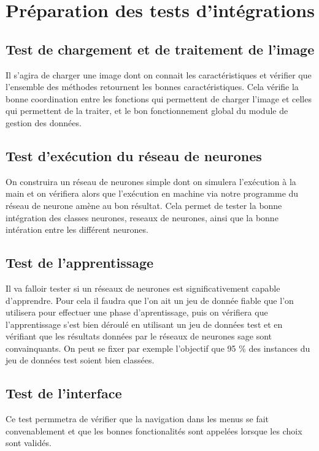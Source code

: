 \section{Préparation des tests d'intégrations}
	
	\subsection{Test de chargement et de traitement de l'image}

Il s'agira de charger une image dont on connait les caract\'eristiques et v\'erifier que l'ensemble des m\'ethodes retournent les bonnes caract\'eristiques. Cela v\'erifie la bonne coordination entre les fonctions qui permettent de charger l'image et celles qui permettent de la traiter, et le bon fonctionnement global du module de gestion des donn\'ees.

	\subsection{Test d'ex\'ecution du r\'eseau de neurones}

On construira un r\'eseau de neurones simple dont on simulera l'ex\'ecution \`a la main et on v\'erifiera alors que l'ex\'ecution en machine via notre programme du r\'eseau de neurone am\`ene au bon r\'esultat. Cela permet de tester la bonne int\'egration des classes neurones, reseaux de neurones, ainsi que la bonne int\'eration entre les différent neurones.

	\subsection{Test de l'apprentissage}

Il va falloir tester si un r\'eseaux de neurones est significativement capable d'apprendre. Pour cela il faudra que l'on ait un jeu de donn\'ee fiable que l'on utilisera pour effectuer une phase d'aprentissage, puis on v\'erifiera que l'apprentissage s'est bien d\'eroul\'e  en utilisant un jeu de donn\'ees test et en v\'erifiant que les r\'esultats donn\'ees par le r\'eseaux de neurones sage sont convainquants. On peut se fixer par exemple l'objectif que 95 \% des instances du jeu de donn\'ees test soient bien class\'ees.

	\subsection{Test de l'interface}

Ce test permmetra de v\'erifier que la navigation dans les menus se fait convenablement et que les bonnes fonctionalit\'es sont appel\'ees lorsque les choix sont valid\'es.